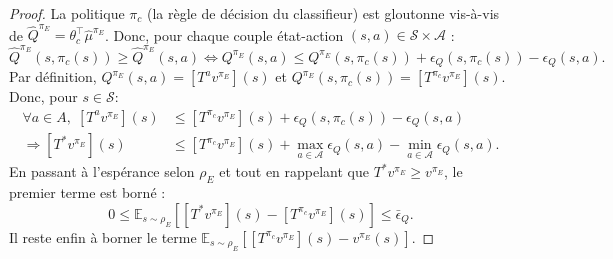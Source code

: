 \documentclass[english,utf8]{./hermes-journal}
\newcommand{\s}{\mathcal{S}}
\newcommand{\A}{\mathcal{A}}
\newcommand{\E}{\mathbb{E}}
\begin{document}
\begin{proof}
  La politique $\pi_c$ (la règle de décision du classifieur) est gloutonne vis-à-vis de 
  $\hat{Q}^{\pi_E}=\theta_c^\top\hat{\mu}^{\pi_E}$. Donc, pour chaque couple état-action
  $(s,a)\in\s\times \A$ :
  \begin{equation}
    \hat{Q}^{\pi_E}(s,\pi_c(s))\geq
    \hat{Q}^{\pi_E}(s,a)
    \Leftrightarrow
    Q^{\pi_E}(s,a) \leq Q^{\pi_E}(s,\pi_c(s)) +
    \epsilon_Q(s,\pi_c(s)) - \epsilon_Q(s,a).
  \end{equation}
  Par définition, $Q^{\pi_E}(s,a) = [T^a v^{\pi_E}](s)$ et
  $Q^{\pi_E}(s,\pi_c(s)) = [T^{\pi_c} v^{\pi_E}](s)$. Donc, pour $s\in\s$:
  \begin{align}
    \forall a\in A,\; [T^a v^{\pi_E}](s) &\leq [T^{\pi_c}
    v^{\pi_E}](s) + \epsilon_Q(s,\pi_c(s))-\epsilon_Q(s,a)
    \\
    \Rightarrow [T^* v^{\pi_E}](s) &\leq [T^{\pi_c}
    v^{\pi_E}](s) + \max_{a\in \A}\epsilon_Q(s,a)-\min_{a\in
    \A}\epsilon_Q(s,a).
  \end{align}
  En passant à l'espérance selon $\rho_E$ et tout en rappelant que 
  $T^* v^{\pi_E}\geq v^{\pi_E}$, le premier terme est borné :
  \begin{equation}
    0 \leq \E_{s\sim\rho_E}\left[ [T^* v^{\pi_E}](s) - [T^{\pi_c}
    v^{\pi_E}](s)\right] \leq \bar{\epsilon}_Q.
    \label{eq:proof:b1}
  \end{equation}
  Il reste enfin à borner le terme $\E_{s\sim\rho_E}[[T^{\pi_c}v^{\pi_E}](s) -
  v^{\pi_E}(s)]$.


\end{proof}
\end{document}
